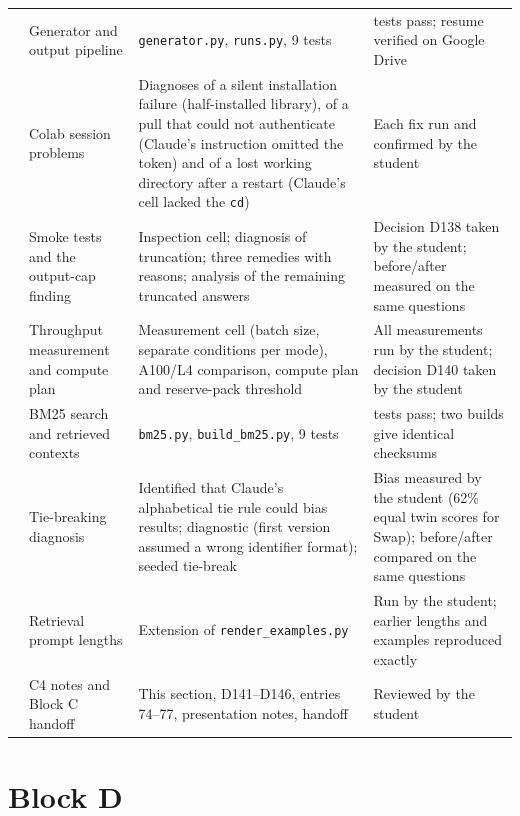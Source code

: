 \documentclass[11pt,a4paper]{report}
\begin{document}
{\begin{longtable}{
  >{\raggedright\arraybackslash}p{0.6cm}
  >{\raggedright\arraybackslash}p{4.4cm}
  >{\raggedright\arraybackslash}p{4.4cm}
  >{\raggedright\arraybackslash}p{4.8cm}}
70 & Generator and output pipeline
  & \texttt{generator.py}, \texttt{runs.py}, 9 tests
  & 143 tests pass; resume verified on Google Drive \\
71 & Colab session problems
  & Diagnoses of a silent installation failure (half-installed library), of a pull that could not authenticate (Claude's instruction omitted the token) and of a lost working directory after a restart (Claude's cell lacked the \texttt{cd})
  & Each fix run and confirmed by the student \\
72 & Smoke tests and the output-cap finding
  & Inspection cell; diagnosis of truncation; three remedies with reasons; analysis of the remaining truncated answers
  & Decision D138 taken by the student; before/after measured on the same questions \\

73 & Throughput measurement and compute plan
  & Measurement cell (batch size, separate conditions per mode), A100/L4 comparison, compute plan and reserve-pack threshold
  & All measurements run by the student; decision D140 taken by the student \\


74 & BM25 search and retrieved contexts
  & \texttt{bm25.py}, \texttt{build\_bm25.py}, 9 tests
  & 152 tests pass; two builds give identical checksums \\
75 & Tie-breaking diagnosis
  & Identified that Claude's alphabetical tie rule could bias results; diagnostic (first version assumed a wrong identifier format); seeded tie-break
  & Bias measured by the student (62\% equal twin scores for Swap); before/after compared on the same questions \\
76 & Retrieval prompt lengths
  & Extension of \texttt{render\_examples.py}
  & Run by the student; earlier lengths and examples reproduced exactly \\
77 & C4 notes and Block C handoff
  & This section, D141--D146, entries 74--77, presentation notes, handoff
  & Reviewed by the student \\


  
\end{longtable}
}

\section{Block D}\label{sec:ailog-d}
\end{document}
